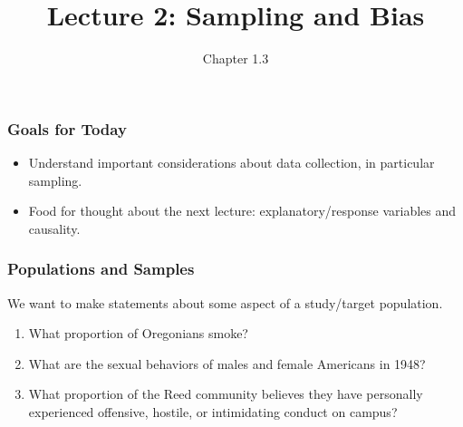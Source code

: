 \documentclass[handout]{beamer}
\title{Lecture 2: Sampling and Bias}
\author{Chapter 1.3}
\date{}
\newcommand{\blue}[1]{\textcolor{blue2}{#1}}
\begin{document}
\begin{frame}
\titlepage
\end{frame}


\begin{frame}
\frametitle{Goals for Today}
\begin{itemize}
  \item Understand important considerations about data collection, in particular \blue{sampling}.
  \item Food for thought about the next lecture: explanatory/response variables and causality.  
\end{itemize}

\end{frame}


\begin{frame}
\frametitle{Populations and Samples}
We want to make statements about some aspect of a \blue{study/target population}.  

\begin{enumerate}
\item What proportion of Oregonians smoke?
\item What are the sexual behaviors of males and female Americans in 1948?
\item What proportion of the Reed community believes they have personally 
experienced offensive, hostile, or intimidating conduct on campus?
\end{enumerate}

\end{frame}
\end{document}
